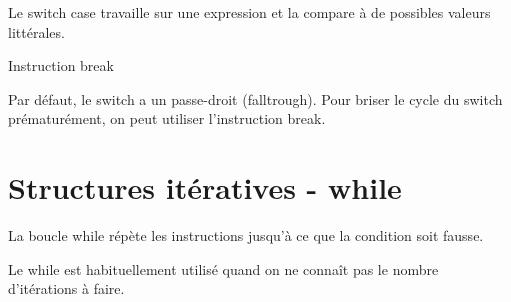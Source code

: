 \begin{frame}[fragile]{}
\protect\hypertarget{section-1}{}

Le switch case travaille sur une expression et la compare à de possibles
valeurs littérales.

\begin{Shaded}
\begin{Highlighting}[]
    \NormalTok{:}
\NormalTok{\}}
\end{Highlighting}
\end{Shaded}

\end{frame}

\begin{frame}[fragile]{Instruction break}
\protect\hypertarget{instruction-break}{}

Par défaut, le switch a un passe-droit (falltrough). Pour briser le
cycle du switch prématurément, on peut utiliser l'instruction break.

\begin{Shaded}
\begin{Highlighting}[]
        \NormalTok{;}
        \NormalTok{;}
    \NormalTok{:}
\NormalTok{\}}
\end{Highlighting}
\end{Shaded}

\end{frame}

\hypertarget{structures-ituxe9ratives---while}{%
\section{Structures itératives -
while}\label{structures-ituxe9ratives---while}}

\begin{frame}[fragile]{}
\protect\hypertarget{section-2}{}

La boucle while répète les instructions jusqu'à ce que la condition soit
fausse.

Le while est habituellement utilisé quand on ne connaît pas le nombre
d'itérations à faire.

\begin{Shaded}
\begin{Highlighting}[]
\NormalTok{\}}
\end{Highlighting}
\end{Shaded}

\end{frame}

